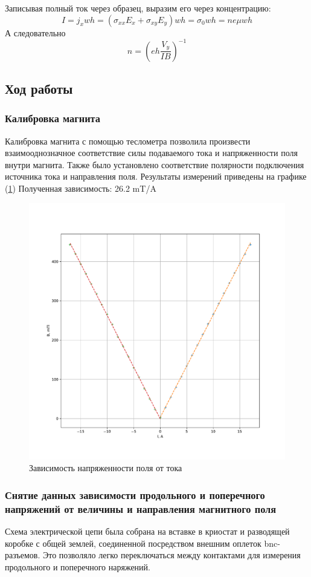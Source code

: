 \documentclass[a4paper, 12pt]{article}
\begin{document}
Записывая полный ток через образец, выразим его через концентрацию:
\begin{equation}
	I=j_xwh=(\sigma_{xx}E_x+\sigma_{xy}E_y)wh=\sigma_0 wh=ne\mu wh
\end{equation}
А следовательно
\begin{equation}
	n=\left(eh\frac{V_y}{IB}\right)^{-1}
\end{equation}
\subsection{Ход работы}
\subsubsection{Калибровка магнита}
Калибровка магнита с помощью теслометра позволила произвести взаимооднозначное соответствие силы подаваемого тока и напряженности поля внутри магнита. Также было установлено соответствие полярности подключения источника тока и направления поля. Результаты измерений приведены на графике (\ref{fig:3_calib}) Полученная зависимость: 26.2 mT/A

\begin{figure}[H]
	\centering
	\includegraphics[width=0.7\linewidth]{3_Calibration.pdf}
	\caption{Зависимость напряженности поля от тока}
	\label{fig:3_calib}
\end{figure}

\subsubsection{Снятие данных зависимости продольного и поперечного напряжений от величины и направления магнитного поля }
Схема электрической цепи была собрана на вставке в криостат и разводящей коробке с общей землей, соединенной посредством внешним оплеток bnc-разъемов. Это позволяло легко переключаться между контактами для измерения продольного и поперечного  наряжений.
\end{document}
